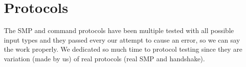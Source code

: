 \section{Protocols}
\small{The SMP and command protocols have been multiple tested with all possible input types and they passed every our attempt to cause an error, so we can say the work properly. We dedicated so much time to protocol testing since they are variation (made by us) of real protocols (real SMP and handshake).}